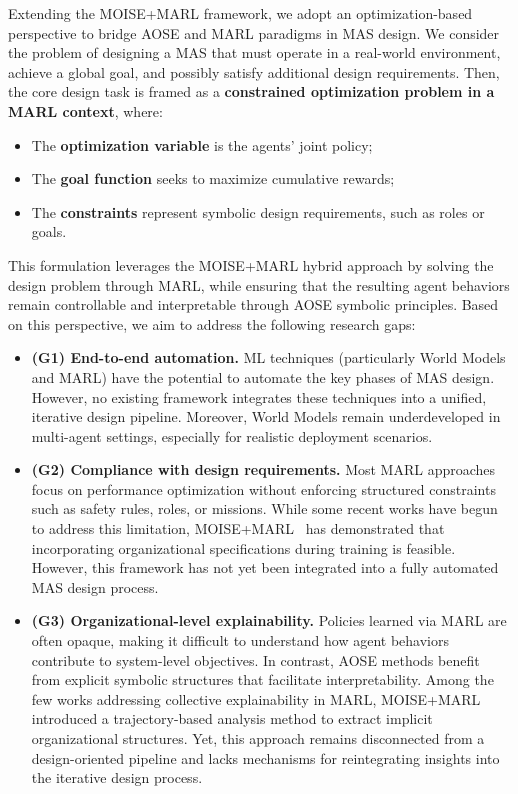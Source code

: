 \documentclass[pdflatex,sn-mathphys-num]{sn-jnl}%
\theoremstyle{thmstyleone}%
\theoremstyle{thmstyletwo}%
\theoremstyle{thmstylethree}%
\begin{document}
Extending the MOISE+MARL framework, we adopt an optimization-based perspective to bridge AOSE and MARL paradigms in MAS design. We consider the problem of designing a MAS that must operate in a real-world environment, achieve a global goal, and possibly satisfy additional design requirements. Then, the core design task is framed as a \textbf{constrained optimization problem in a MARL context}, where:
\begin{itemize}
    \item The \textbf{optimization variable} is the agents' joint policy;
    \item The \textbf{goal function} seeks to maximize cumulative rewards;
    \item The \textbf{constraints} represent symbolic design requirements, such as roles or goals.
\end{itemize}

\noindent This formulation leverages the MOISE+MARL hybrid approach by solving the design problem through MARL, while ensuring that the resulting agent behaviors remain controllable and interpretable through AOSE symbolic principles. Based on this perspective, we aim to address the following research gaps:
%
\begin{itemize}
    \item \textbf{(G1) End-to-end automation.} ML techniques (particularly World Models and MARL) have the potential to automate the key phases of MAS design. However, no existing framework integrates these techniques into a unified, iterative design pipeline. Moreover, World Models remain underdeveloped in multi-agent settings, especially for realistic deployment scenarios.

    \item \textbf{(G2) Compliance with design requirements.} Most MARL approaches focus on performance optimization without enforcing structured constraints such as safety rules, roles, or missions. While some recent works have begun to address this limitation, MOISE+MARL~\cite{soule2025moisemarl} has demonstrated that incorporating organizational specifications during training is feasible. However, this framework has not yet been integrated into a fully automated MAS design process.

    \item \textbf{(G3) Organizational-level explainability.} Policies learned via MARL are often opaque, making it difficult to understand how agent behaviors contribute to system-level objectives. In contrast, AOSE methods benefit from explicit symbolic structures that facilitate interpretability. Among the few works addressing collective explainability in MARL, MOISE+MARL~\cite{soule2025moisemarl} introduced a trajectory-based analysis method to extract implicit organizational structures. Yet, this approach remains disconnected from a design-oriented pipeline and lacks mechanisms for reintegrating insights into the iterative design process.
\end{itemize}
\end{document}
